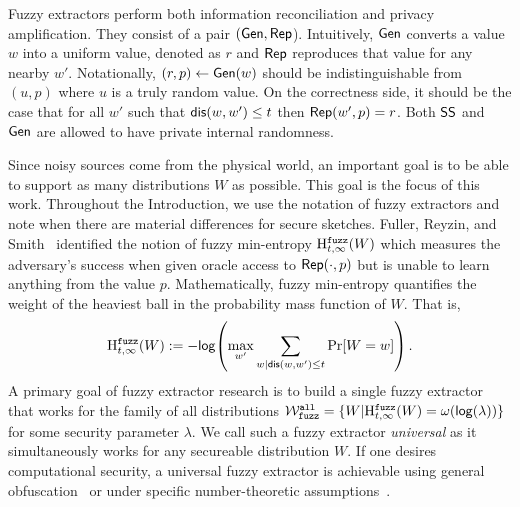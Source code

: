   Fuzzy extractors perform both information reconciliation and privacy amplification.  They consist of a pair $({\mathsf{Gen}}, {\mathsf{Rep}}$).  Intuitively, ${\mathsf{Gen}}$ converts a value $w$ into a uniform value, denoted as $r$ and ${\mathsf{Rep}}$ reproduces that value for any nearby $w'$.  Notationally, $(r, p)\leftarrow {\ensuremath{\mathsf{Gen}}}(w)$ should be indistinguishable from $(u, p)$ where $u$ is a truly random value.  On the correctness side, it should be the case that for all $w'$ such that $\mathsf{dis}(w, w')\le t$ then ${\mathsf{Rep}}(w', p) =r$.  
  Both ${\mathsf{SS}}$ and ${\mathsf{Gen}}$ are allowed to have private internal randomness.  
  
  
Since noisy sources come from the physical world, an important goal
  is to be able to support as many distributions $W$ as possible. This goal is the focus of this work. 
  Throughout the Introduction, we use the notation of fuzzy extractors
  and note when there are material differences for secure sketches.
  Fuller, Reyzin, and Smith~\cite{fuller2016fuzzy,fuller2020fuzzy}
  identified the notion of fuzzy min-entropy $\mathrm{H}^{\mathtt{fuzz}}_{t,\infty}(W)$ which
  measures the adversary's success when given oracle access to
  ${\mathsf{Rep}}(\cdot, p)$ but is unable to learn anything from the value $p$.
  Mathematically, fuzzy min-entropy quantifies the weight of the heaviest ball
  in the probability mass function of $W$.  That is,
\[
\mathrm{H}^{\mathtt{fuzz}}_{t,\infty}(W):= -\mathsf{log}\!\left(\max_{w'} \sum_{w | \mathsf{dis}(w, w')\le t} \Pr[W=w]\right).
\]A primary goal of fuzzy extractor research is to build a single fuzzy extractor that works for the family of all distributions $\mathcal{W}_{\mathtt{fuzz}}^{\mathtt{all}} = \{ W | \mathrm{H}^{\mathtt{fuzz}}_{t,\infty}(W) = \omega(\mathsf{log}\!\left(\lambda\right))\}$ for some security parameter $\lambda$.  We call such a fuzzy extractor \emph{universal} as it simultaneously works for any secureable distribution $W$. 
If one desires computational security, a universal fuzzy extractor is achievable using general obfuscation~\cite{BarakBCKPS13,BitanskyCKP14,bitansky2017virtual} or under specific number-theoretic assumptions~\cite{galbraith2019obfuscated}. 


